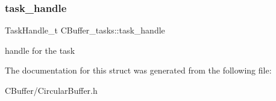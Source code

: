 \subsubsection{\texorpdfstring{task\+\_\+handle}{task\_handle}}
{\footnotesize\ttfamily Task\+Handle\+\_\+t C\+Buffer\+\_\+tasks\+::task\+\_\+handle}

handle for the task 

The documentation for this struct was generated from the following file\+:\begin{DoxyCompactItemize}
\item 
C\+Buffer/Circular\+Buffer.\+h\end{DoxyCompactItemize}
